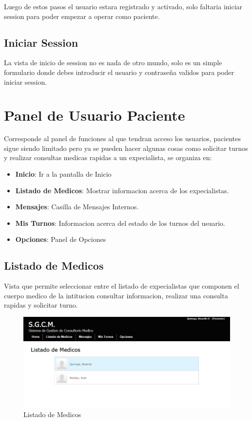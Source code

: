 Luego de estos pasos el usuario estara registrado y activado, solo faltaria
iniciar session para poder empezar a operar como paciente.

\subsection{Iniciar Session}

La vista de inicio de session no es nada de otro mundo, solo es un simple
formulario donde debes introducir el usuario y contraseña validos para poder
iniciar session.


\section{Panel de Usuario Paciente}

Corresponde al panel de funciones al que tendran acceso los usuarios, pacientes
sigue siendo limitado pero ya se pueden hacer algunas cosas como solicitar
turnos y realizar consultas medicas rapidas a un expecialista, se organiza en:

\begin{itemize}
    \item \textbf{Inicio}: Ir a la pantalla de Inicio
    \item \textbf{Listado de Medicos}: Mostrar informacion  acerca de los expecialistas.
    \item \textbf{Mensajes}: Casilla de Mensajes Internos.
    \item \textbf{Mis Turnos}: Informacion acerca del estado de los turnos del usuario.
    \item \textbf{Opciones}: Panel de Opciones
\end{itemize}


\subsection{Listado de Medicos}

Vista que permite seleccionar entre el listado de expecialistas que componen el
cuerpo medico de la intitucion consultar informacion, realizar una consulta rapidas
y solicitar turno.

\begin{figure}[H]
    \centering
    \includegraphics[scale=0.5]{resourse/listado-medico.png}
    \caption{Listado de Medicos}
    \label{fig:67}
\end{figure}

